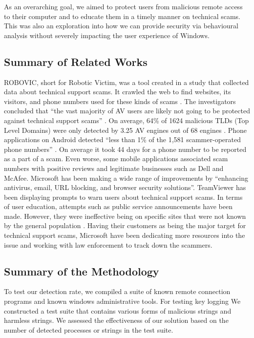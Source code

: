\documentclass[final]{IEEEtran}
\begin{document}
As an overarching goal, we aimed to protect users from malicious remote access to their computer and to educate them in a timely manner on technical scams. This was also an exploration into how we can provide security via behavioural analysis without severely impacting the user experience of Windows.

\subsection{Summary of Related Works}

ROBOVIC, short for Robotic Victim, was a tool created in a study that collected data about technical support scams. It crawled the web to find websites, its visitors, and phone numbers used for these kinds of scams \cite[Fig 2]{b2}. The investigators concluded that “the vast majority of AV users are likely not going to be protected against technical support scams”  \cite[p.7]{b2}. On average, 64\% of 1624 malicious TLDs (Top Level Domains) were only detected by 3.25 AV engines out of 68 engines \cite[p.7]{b2}. Phone applications on Android detected “less than 1\% of the 1,581 scammer-operated phone numbers” \cite[p.8]{b2}. On average it took 44 days for a phone number to be reported as a part of a scam. Even worse, some mobile applications associated scam numbers with positive reviews and legitimate businesses such as Dell and McAfee. Microsoft has been making a wide range of improvements by “enhancing antivirus, email, URL blocking, and browser security solutions”. TeamViewer has been displaying prompts to warn users about technical support scams. In terms of user education, attempts such as public service announcements have been made. However, they were ineffective being on specific sites that were not known by the general population  \cite[p.13]{b2}. Having their customers as being the major target for technical support scams, Microsoft have been dedicating more resources into the issue and working with law enforcement to track down the scammers.



\subsection{Summary of the Methodology}
To test our detection rate, we compiled a suite of known remote connection programs and known windows administrative tools.
For testing key logging We constructed a test suite that contains various forms of malicious strings and harmless strings.
We assessed the effectiveness of our solution based on the number of detected processes or strings in the test suite.
\end{document}
